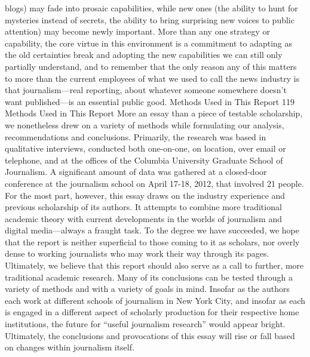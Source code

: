 blogs) may fade into prosaic capabilities, while new ones (the ability to hunt for
mysteries instead of secrets, the ability to bring surprising new voices to public
attention) may become newly important.
More than any one strategy or capability, the core virtue in this environment is a
commitment to adapting as the old certainties break and adopting the new capabilities
we can still only partially understand, and to remember that the only reason
any of this matters to more than the current employees of what we used to
call the news industry is that journalism—real reporting, about whatever someone
somewhere doesn’t want published—is an essential public good.
Methods Used in This Report 119
Methods Used in This Report
More an essay than a piece of testable scholarship, we nonetheless drew on a
variety of methods while formulating our analysis, recommendations and conclusions.
Primarily, the research was based in qualitative interviews, conducted
both one-on-one, on location, over email or telephone, and at the offices of the
Columbia University Graduate School of Journalism. A significant amount of
data was gathered at a closed-door conference at the journalism school on April
17-18, 2012, that involved 21 people.
For the most part, however, this essay draws on the industry experience and
previous scholarship of its authors. It attempts to combine more traditional academic
theory with current developments in the worlds of journalism and digital
media—always a fraught task. To the degree we have succeeded, we hope that the
report is neither superficial to those coming to it as scholars, nor overly dense to
working journalists who may work their way through its pages.
Ultimately, we believe that this report should also serve as a call to further, more
traditional academic research. Many of its conclusions can be tested through a variety
of methods and with a variety of goals in mind. Insofar as the authors each
work at different schools of journalism in New York City, and insofar as each is
engaged in a different aspect of scholarly production for their respective home
institutions, the future for ``useful journalism research'' would appear bright. Ultimately,
the conclusions and provocations of this essay will rise or fall based on
changes within journalism itself.



